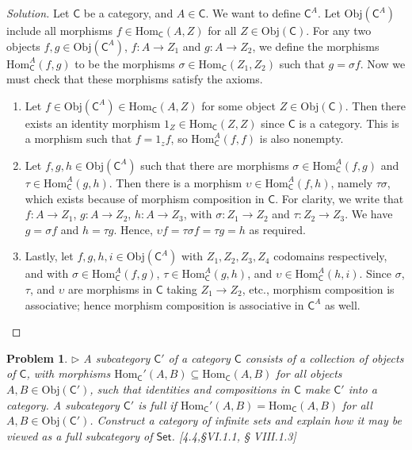 \documentclass[fontsize=14pt]{scrartcl}
\newtheorem{problem-internal}{Problem}[subsection]
\newenvironment{problem}{
  \medskip
  \begin{problem-internal}
}{
  \end{problem-internal}
}
\newenvironment{solution}{
  \begin{proof}[Solution]
  \vspace{-8px}
  \setlength{\parskip}{4px}
  \setlength{\parindent}{0px}
}{
  \end{proof}
}
\newcommand{\Obj}{\mathrm{Obj}}
\newcommand{\Hom}{\mathrm{Hom}}
\begin{document}
\begin{solution}
\def \C {\mathsf{C}}
\def \CA {\mathsf{C}^A}

Let $\C$ be a category, and $A\in\C$. We want to define $\CA$. Let $\Obj(\CA)$
include all morphisms $f\in\Hom_\C(A,Z)$ for all $Z\in\Obj(\C)$. For any two
objects $f,g\in\Obj(\CA)$, $f:A\to Z_1$ and $g:A\to Z_2$, we define the
morphisms $\Hom_\CA(f,g)$ to be the morphisms $\sigma\in\Hom_\C(Z_1, Z_2)$ such
that $g=\sigma f$. Now we must check that these morphisms satisfy the axioms.

\begin{enumerate}
\item Let $f\in\Obj(\CA)\in\Hom_\C(A,Z)$ for some object $Z\in\Obj(\C)$. Then
there exists an identity morphism $1_Z\in\Hom_\C(Z,Z)$ since $\C$ is a category.
This is a morphism such that $f=1_zf$, so $\Hom_\CA(f,f)$ is also nonempty.

\item Let $f,g,h\in\Obj(\CA)$ such that there are morphisms
$\sigma\in\Hom_\CA(f,g)$ and $\tau\in\Hom_\CA(g,h)$. Then there is a morphism
$\upsilon\in\Hom_\CA(f,h)$, namely $\tau\sigma$, which exists because of
morphism composition in $\C$. For clarity, we write that  $f:A\to Z_1$, $g:A\to
Z_2$, $h:A\to Z_3$, with $\sigma:Z_1\to Z_2$ and $\tau:Z_2\to Z_3$. We have
$g=\sigma f$ and $h=\tau g$. Hence, $\upsilon f = \tau\sigma f = \tau g = h$ as
required.

\item Lastly, let $f,g,h,i\in\Obj(\CA)$ with $Z_1, Z_2, Z_3, Z_4$ codomains
respectively, and with $\sigma\in\Hom_\CA(f,g)$, $\tau\in\Hom_\CA(g,h)$, and
$\upsilon\in\Hom_\CA(h,i)$. Since $\sigma$, $\tau$, and $\upsilon$ are morphisms
in $\C$ taking $Z_1\to Z_2$, etc., morphism composition is associative; hence
morphism composition is associative in $\CA$ as well.
\end{enumerate}
\end{solution}


\begin{problem}
\def \C {\mathsf{C}}
\def \Cp {\C'}

$\rhd$ A \textit{subcategory} $\Cp$ of a category $\C$ consists of a
collection of objects of $\C$, with morphisms
$\Hom_\Cp(A,B) \subseteq \Hom_\C(A,B)$ for all objects $A,B\in\Obj(\Cp)$, such
that identities and compositions in $\C$ make $\Cp$ into a category. A
subcategory $\Cp$ is \textit{full} if $\Hom_\Cp(A,B) = \Hom_\C(A,B)$ for all
$A,B\in\Obj(\Cp)$. Construct a category of \textit{infinite sets} and explain
how it may be viewed as a full subcategory of $\mathsf{Set}$. [4.4,\S VI.1.1, \S
VIII.1.3]
\end{problem}
\end{document}
